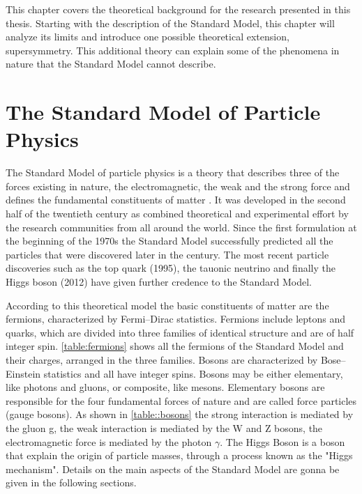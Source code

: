
This chapter covers the theoretical background for the research presented in this thesis. Starting with the description of the Standard Model, this chapter will analyze its limits and introduce one possible theoretical extension, supersymmetry. This additional theory can explain some of the phenomena in nature that the Standard Model cannot describe.

\section{The Standard Model of Particle Physics}

The Standard Model of particle physics is a theory that describes three of the forces existing in nature, the electromagnetic, the weak and the strong force and defines the fundamental constituents of matter \cite{Spiesberger:2000ks}. It was developed in the second half of the twentieth century as combined theoretical and experimental effort by the research communities from all around the world. Since the first formulation at the beginning of the 1970s the Standard Model successfully predicted all the particles that were discovered later in the century. The most recent particle discoveries such as the top quark \cite{Campagnari:1996ai} (1995), the tauonic neutrino \cite{Agafonova:2015jxn} and finally the Higgs boson \cite{Aad:2012tfa,Chatrchyan:2012xdj}(2012) have given further credence to the Standard Model. 

According to this theoretical model the basic constituents of matter are the fermions, characterized by Fermi–Dirac statistics. Fermions include leptons and quarks, which are divided into three families of identical structure and are of half integer spin. \autoref{table:fermions} shows all the fermions of the Standard Model and their charges, arranged in the three families. Bosons are characterized by Bose–Einstein statistics and all have integer spins. Bosons may be either elementary, like photons and gluons, or composite, like mesons. Elementary bosons are responsible for the four fundamental forces of nature and are called force particles (gauge bosons). As shown in \autoref{table::bosons} the strong interaction is mediated by the gluon g, the weak interaction is mediated by the W and Z bosons, the electromagnetic force is mediated by the photon $\gamma$. The Higgs Boson is a boson that explain the origin of particle masses, through a process known as the "Higgs mechanism". Details on the main aspects of the Standard Model are gonna be given in the following sections.

